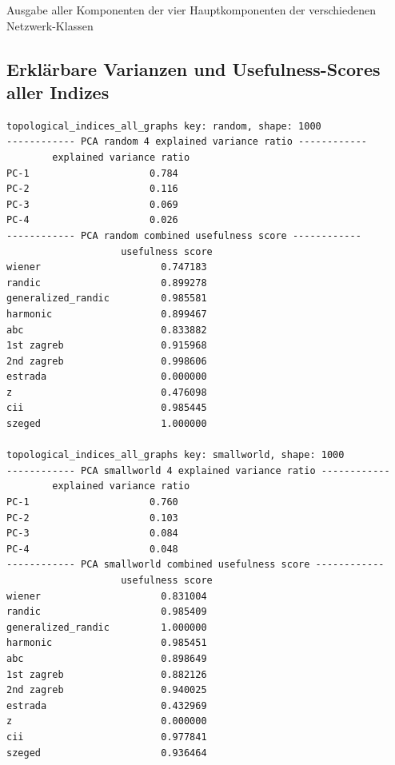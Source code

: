 \begin{landscape}
\begin{code}
\begin{verbatim}
        \end{verbatim}
        \caption{Ausgabe aller Komponenten der vier Hauptkomponenten der verschiedenen Netzwerk-Klassen}
        \vspace*{\fill}
    \end{code}
\end{landscape}

\subsection{Erklärbare Varianzen und Usefulness-Scores aller Indizes} \label{sec:all_pca}
\begin{code}
    \begin{verbatim}   
topological_indices_all_graphs key: random, shape: 1000
------------ PCA random 4 explained variance ratio ------------
        explained variance ratio
PC-1                     0.784
PC-2                     0.116
PC-3                     0.069
PC-4                     0.026
------------ PCA random combined usefulness score ------------
                    usefulness score
wiener                     0.747183
randic                     0.899278
generalized_randic         0.985581
harmonic                   0.899467
abc                        0.833882
1st zagreb                 0.915968
2nd zagreb                 0.998606
estrada                    0.000000
z                          0.476098
cii                        0.985445
szeged                     1.000000

topological_indices_all_graphs key: smallworld, shape: 1000
------------ PCA smallworld 4 explained variance ratio ------------
        explained variance ratio
PC-1                     0.760
PC-2                     0.103
PC-3                     0.084
PC-4                     0.048
------------ PCA smallworld combined usefulness score ------------
                    usefulness score
wiener                     0.831004
randic                     0.985409
generalized_randic         1.000000
harmonic                   0.985451
abc                        0.898649
1st zagreb                 0.882126
2nd zagreb                 0.940025
estrada                    0.432969
z                          0.000000
cii                        0.977841
szeged                     0.936464


\end{verbatim}
\end{code}

